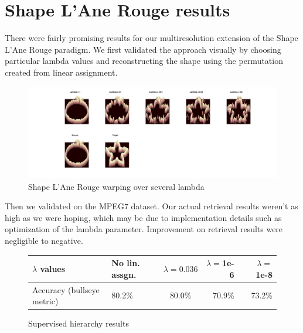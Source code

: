 \documentclass[../tech_report_1.tex]{subfiles}
\begin{document}

\section{Shape L'Ane Rouge results}

There were fairly promising results for our multiresolution extension of the Shape L'Ane Rouge paradigm. We first validated the approach visually by choosing particular lambda values and reconstructing the shape using the permutation created from linear assignment.

\begin{figure}[ht]
	\caption{Shape L'Ane Rouge warping over several lambda}
	\includegraphics[width=\textwidth]{warp}
\end{figure}

Then we validated on the MPEG7 dataset. Our actual retrieval results weren't as high as we were hoping, which may be due to implementation details such as optimization of the lambda parameter. Improvement on retrieval results were negligible to negative.

\begin{figure}[ht]
\caption{Supervised hierarchy results\label{fig:supervised_hierarchy}}
\centering
\begin{tabular}{ l | l c r r}
	$\lambda$ values & No lin. assgn. & $\lambda=0.036$ & $\lambda=$1e-6 & $\lambda=$ 1e-8\\
	\hline
	Accuracy (bullseye metric)& 80.2\% & 80.0\% & 70.9\% & 73.2\% \\
\end{tabular}
\end{figure}
\end{document}
